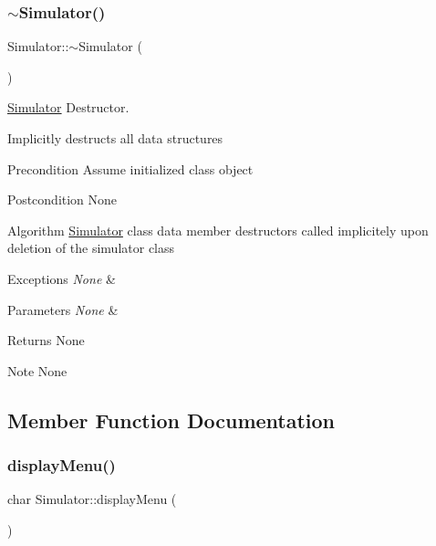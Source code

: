 \subsubsection{\texorpdfstring{$\sim$\+Simulator()}{~Simulator()}}
{\footnotesize\ttfamily Simulator\+::$\sim$\+Simulator (\begin{DoxyParamCaption}{ }\end{DoxyParamCaption})}



\hyperlink{class_simulator}{Simulator} Destructor. 

Implicitly destructs all data structures

\begin{DoxyPrecond}{Precondition}
Assume initialized class object
\end{DoxyPrecond}
\begin{DoxyPostcond}{Postcondition}
None
\end{DoxyPostcond}
\begin{DoxyParagraph}{Algorithm}
\hyperlink{class_simulator}{Simulator} class data member destructors called implicitely upon deletion of the simulator class
\end{DoxyParagraph}

\begin{DoxyExceptions}{Exceptions}
{\em None} & \\
\hline
\end{DoxyExceptions}

\begin{DoxyParams}{Parameters}
{\em None} & \\
\hline
\end{DoxyParams}
\begin{DoxyReturn}{Returns}
None
\end{DoxyReturn}
\begin{DoxyNote}{Note}
None 
\end{DoxyNote}


\subsection{Member Function Documentation}
\hypertarget{class_simulator_aa6bb404bb0e612f3fa498c674f18dd21}{}\label{class_simulator_aa6bb404bb0e612f3fa498c674f18dd21} 
\subsubsection{\texorpdfstring{display\+Menu()}{displayMenu()}}
{\footnotesize\ttfamily char Simulator\+::display\+Menu (\begin{DoxyParamCaption}{ }\end{DoxyParamCaption})}



